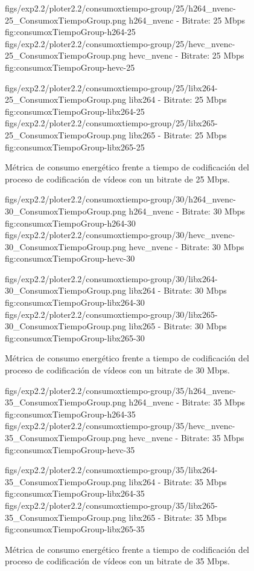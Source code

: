 \begin{figure}[H]
 \centering
 \small
 \dosubfigs
 {figs/exp2.2/ploter2.2/consumoxtiempo-group/25/h264_nvenc-25_ConsumoxTiempoGroup.png}
 {h264\_nvenc - Bitrate: 25 Mbps}
 {fig:consumoxTiempoGroup-h264-25}
 {figs/exp2.2/ploter2.2/consumoxtiempo-group/25/hevc_nvenc-25_ConsumoxTiempoGroup.png}
 {hevc\_nvenc - Bitrate: 25 Mbps}
 {fig:consumoxTiempoGroup-hevc-25}

 \dosubfigs
 {figs/exp2.2/ploter2.2/consumoxtiempo-group/25/libx264-25_ConsumoxTiempoGroup.png}
 {libx264 - Bitrate: 25 Mbps}
 {fig:consumoxTiempoGroup-libx264-25}
 {figs/exp2.2/ploter2.2/consumoxtiempo-group/25/libx265-25_ConsumoxTiempoGroup.png}
 {libx265 - Bitrate: 25 Mbps}
 {fig:consumoxTiempoGroup-libx265-25}

 \caption{Métrica de consumo energético frente a tiempo de codificación del proceso de codificación de vídeos con un bitrate de 25 Mbps.}
\end{figure}


\begin{figure}[H]
 \centering
 \small
 \dosubfigs
 {figs/exp2.2/ploter2.2/consumoxtiempo-group/30/h264_nvenc-30_ConsumoxTiempoGroup.png}
 {h264\_nvenc - Bitrate: 30 Mbps}
 {fig:consumoxTiempoGroup-h264-30}
 {figs/exp2.2/ploter2.2/consumoxtiempo-group/30/hevc_nvenc-30_ConsumoxTiempoGroup.png}
 {hevc\_nvenc - Bitrate: 30 Mbps}
 {fig:consumoxTiempoGroup-hevc-30}

 \dosubfigs
 {figs/exp2.2/ploter2.2/consumoxtiempo-group/30/libx264-30_ConsumoxTiempoGroup.png}
 {libx264 - Bitrate: 30 Mbps}
 {fig:consumoxTiempoGroup-libx264-30}
 {figs/exp2.2/ploter2.2/consumoxtiempo-group/30/libx265-30_ConsumoxTiempoGroup.png}
 {libx265 - Bitrate: 30 Mbps}
 {fig:consumoxTiempoGroup-libx265-30}

 \caption{Métrica de consumo energético frente a tiempo de codificación del proceso de codificación de vídeos con un bitrate de 30 Mbps.}
\end{figure}


\begin{figure}[H]
 \centering
 \small
 \dosubfigs
 {figs/exp2.2/ploter2.2/consumoxtiempo-group/35/h264_nvenc-35_ConsumoxTiempoGroup.png}
 {h264\_nvenc - Bitrate: 35 Mbps}
 {fig:consumoxTiempoGroup-h264-35}
 {figs/exp2.2/ploter2.2/consumoxtiempo-group/35/hevc_nvenc-35_ConsumoxTiempoGroup.png}
 {hevc\_nvenc - Bitrate: 35 Mbps}
 {fig:consumoxTiempoGroup-hevc-35}

 \dosubfigs
 {figs/exp2.2/ploter2.2/consumoxtiempo-group/35/libx264-35_ConsumoxTiempoGroup.png}
 {libx264 - Bitrate: 35 Mbps}
 {fig:consumoxTiempoGroup-libx264-35}
 {figs/exp2.2/ploter2.2/consumoxtiempo-group/35/libx265-35_ConsumoxTiempoGroup.png}
 {libx265 - Bitrate: 35 Mbps}
 {fig:consumoxTiempoGroup-libx265-35}

 \caption{Métrica de consumo energético frente a tiempo de codificación del proceso de codificación de vídeos con un bitrate de 35 Mbps.}
\end{figure}


